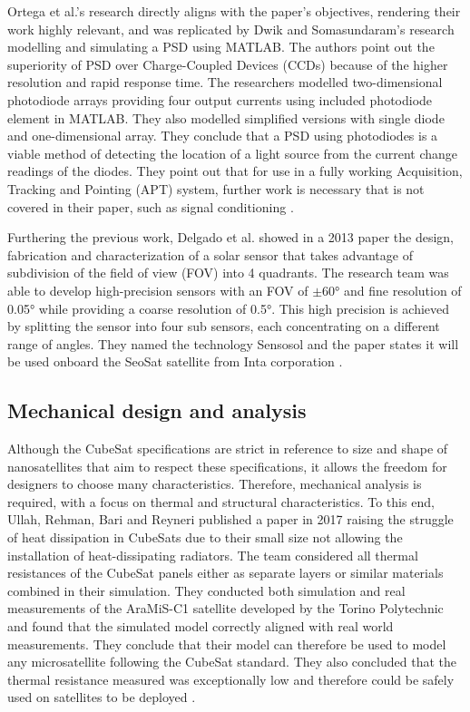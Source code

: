 Ortega et al.'s research directly aligns with the paper's objectives, rendering their work highly relevant, and was replicated by Dwik and Somasundaram's research modelling and simulating a PSD using MATLAB. The authors point out the superiority of PSD over Charge-Coupled Devices (CCDs) because of the higher resolution and rapid response time. The researchers modelled two-dimensional photodiode arrays providing four output currents using included photodiode element in MATLAB. They also modelled simplified versions with single diode and one-dimensional array. They conclude that a PSD using photodiodes is a viable method of detecting the location of a light source from the current change readings of the diodes. They point out that for use in a fully working Acquisition, Tracking and Pointing (APT) system, further work is necessary that is not covered in their paper, such as signal conditioning \cite{Dwik2019}. 

Furthering the previous work, Delgado et al. showed in a 2013 paper the design, fabrication and characterization of a solar sensor that takes advantage of subdivision of the field of view (FOV) into 4 quadrants. The research team was able to develop high-precision sensors with an FOV of $\pm$60° and fine resolution of 0.05° while providing a coarse resolution of 0.5°. This high precision is achieved by splitting the sensor into four sub sensors, each concentrating on a different range of angles. They named the technology Sensosol and the paper states it will be used onboard the SeoSat satellite from Inta corporation \cite{Delgado2013}.

\subsection{Mechanical design and analysis}
Although the CubeSat specifications are strict in reference to size and shape of nanosatellites that aim to respect these specifications, it allows the freedom for designers to choose many characteristics. Therefore, mechanical analysis is required, with a focus on thermal and structural characteristics. To this end, Ullah, Rehman, Bari and Reyneri published a paper in 2017 raising the struggle of heat dissipation in CubeSats due to their small size not allowing the installation of heat-dissipating radiators. The team considered all thermal resistances of the CubeSat panels either as separate layers or similar materials combined in their simulation. They conducted both simulation and real measurements of the AraMiS-C1 satellite developed by the Torino Polytechnic and found that the simulated model correctly aligned with real world measurements. They conclude that their model can therefore be used to model any microsatellite following the CubeSat standard. They also concluded that the thermal resistance measured was exceptionally low and therefore could be safely used on satellites to be deployed \cite{Ullah2017}. 

